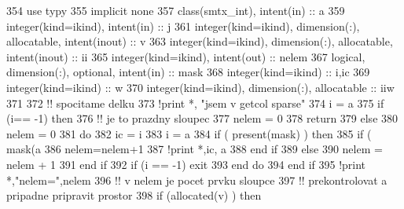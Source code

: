 \begin{DoxyCode}
354         \textcolor{keywordtype}{use }typy
355         \textcolor{keywordtype}{implicit none}
357         \textcolor{keywordtype}{class}(smtx\_int), \textcolor{keywordtype}{intent(in)} :: a
359         \textcolor{keywordtype}{integer(kind=ikind)}, \textcolor{keywordtype}{intent(in)} :: j
361         \textcolor{keywordtype}{integer(kind=ikind)}, \textcolor{keywordtype}{dimension(:)}, \textcolor{keywordtype}{allocatable}, \textcolor{keywordtype}{intent(inout)} :: v
363         \textcolor{keywordtype}{integer(kind=ikind)}, \textcolor{keywordtype}{dimension(:)}, \textcolor{keywordtype}{allocatable}, \textcolor{keywordtype}{intent(inout)} :: ii
365         \textcolor{keywordtype}{integer(kind=ikind)}, \textcolor{keywordtype}{intent(out)} :: nelem
367         \textcolor{keywordtype}{logical}, \textcolor{keywordtype}{dimension(:)}, \textcolor{keywordtype}{optional}, \textcolor{keywordtype}{intent(in)} :: mask
368         \textcolor{keywordtype}{integer(kind=ikind)} :: i,ic
369         \textcolor{keywordtype}{integer(kind=ikind)} :: w
370         \textcolor{keywordtype}{integer(kind=ikind)}, \textcolor{keywordtype}{dimension(:)}, \textcolor{keywordtype}{allocatable} :: iiw
371 
372         \textcolor{comment}{!! spocitame delku
}
373         \textcolor{comment}{!print *, "jsem v getcol sparse"
}
374         i = a%
375         \textcolor{keywordflow}{if} (i== -1) then
376             \textcolor{comment}{!! je to prazdny sloupec
}
377             nelem = 0
378             return
379         else
380             nelem = 0
381             do
382                 ic = i
383                 i = a%
384                 \textcolor{keywordflow}{if} ( \textcolor{keyword}{present}(mask) ) then
385                     \textcolor{keywordflow}{if} ( mask(a%
386                         nelem=nelem+1
387                         \textcolor{comment}{!print *,ic, a%
}
388 \textcolor{keyword}{                    end }if
389                 else
390                     nelem = nelem + 1
391 \textcolor{keyword}{                end }if
392                 \textcolor{keywordflow}{if} (i == -1) exit
393 \textcolor{keyword}{            end }do
394 \textcolor{keyword}{        end }if
395         \textcolor{comment}{!print *,"nelem=",nelem
}
396         \textcolor{comment}{!! v nelem je pocet prvku sloupce
}
397         \textcolor{comment}{!! prekontrolovat a pripadne pripravit prostor
}
398         \textcolor{keywordflow}{if} (\textcolor{keyword}{allocated}(v) ) then

\end{DoxyCode}
